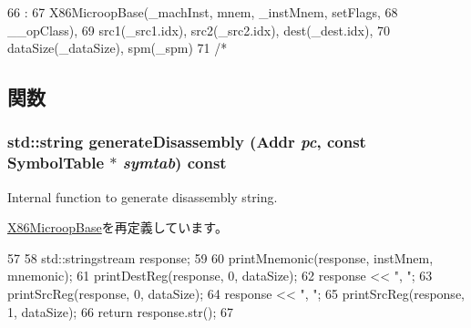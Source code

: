 \begin{DoxyCode}
66                                    :
67             X86MicroopBase(_machInst, mnem, _instMnem, setFlags,
68                     __opClass),
69             src1(_src1.idx), src2(_src2.idx), dest(_dest.idx),
70             dataSize(_dataSize), spm(_spm)
71         {}
/*
\end{DoxyCode}


\subsection{関数}
\hypertarget{classX86ISA_1_1FpOp_a95d323a22a5f07e14d6b4c9385a91896}{
\subsubsection[{generateDisassembly}]{\setlength{\rightskip}{0pt plus 5cm}std::string generateDisassembly ({\bf Addr} {\em pc}, \/  const {\bf SymbolTable} $\ast$ {\em symtab}) const}}
\label{classX86ISA_1_1FpOp_a95d323a22a5f07e14d6b4c9385a91896}
Internal function to generate disassembly string. 

\hyperlink{classX86ISA_1_1X86MicroopBase_a95d323a22a5f07e14d6b4c9385a91896}{X86MicroopBase}を再定義しています。


\begin{DoxyCode}
57     {
58         std::stringstream response;
59 
60         printMnemonic(response, instMnem, mnemonic);
61         printDestReg(response, 0, dataSize);
62         response << ", ";
63         printSrcReg(response, 0, dataSize);
64         response << ", ";
65         printSrcReg(response, 1, dataSize);
66         return response.str();
67     }
\end{DoxyCode}



